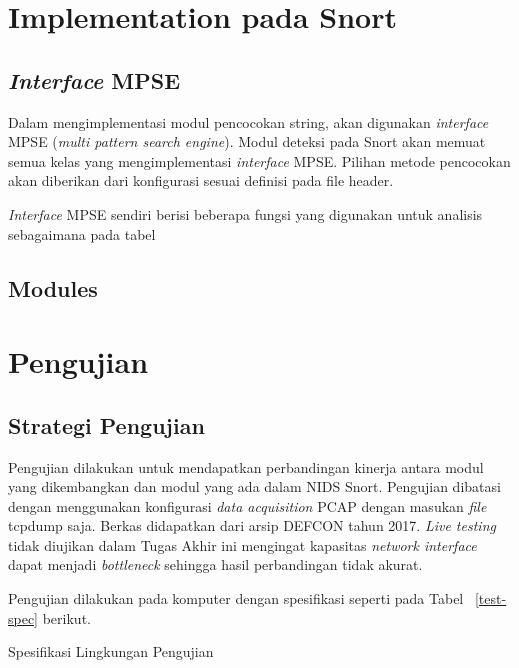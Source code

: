 \documentclass[conference]{IEEEtran}
\begin{document}
\section{Implementation pada Snort}
    \subsection{\emph{Interface} MPSE}
        Dalam mengimplementasi modul pencocokan string, akan digunakan \emph{interface} MPSE (\emph{multi pattern search engine}). Modul deteksi pada Snort akan memuat semua kelas yang mengimplementasi \emph{interface} MPSE. Pilihan metode pencocokan akan diberikan dari konfigurasi sesuai definisi pada file header.

        \emph{Interface} MPSE sendiri berisi beberapa fungsi yang digunakan untuk analisis sebagaimana pada tabel 

    \subsection{Modules}

\section{Pengujian}
    \subsection{Strategi Pengujian}
        Pengujian dilakukan untuk mendapatkan perbandingan kinerja antara modul yang dikembangkan dan modul yang ada dalam NIDS Snort. Pengujian dibatasi dengan menggunakan konfigurasi \emph{data acquisition} PCAP dengan masukan \emph{file} tcpdump saja. Berkas didapatkan dari arsip DEFCON tahun 2017. \emph{Live testing} tidak diujikan dalam Tugas Akhir ini mengingat kapasitas \emph{network interface} dapat menjadi \emph{bottleneck} sehingga hasil perbandingan tidak akurat.

        Pengujian dilakukan pada komputer dengan spesifikasi seperti pada Tabel ~\ref{test-spec} berikut.
        
        \begin{table}[htbp]
            \caption {Spesifikasi Lingkungan Pengujian}
            \begin{center}
            
            \label{test-spec}
            \end{center}
        \end{table}
\end{document}

